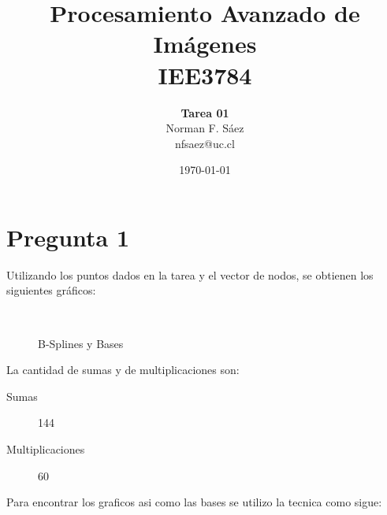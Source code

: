 \documentclass[a4paper,10pt]{article}
\title{Procesamiento Avanzado de Imágenes\\IEE3784}
\author{\textbf{Tarea 01}\\Norman F. S\'aez\\nfsaez@uc.cl}
\date{\today}
\begin{document}
\maketitle
\section{Pregunta 1}
Utilizando los puntos dados en la tarea y el vector de nodos, se obtienen los siguientes gráficos:
\begin{figure}[ht!]
  \centering
  ~ 
  ~ 
  \caption{B-Splines y Bases}
  \label{fig:p1}
\end{figure}
La cantidad de sumas y de multiplicaciones son:
\begin{description}
\item[Sumas] 144
\item[Multiplicaciones] 60
\end{description} 
Para encontrar los graficos asi como las bases se utilizo la tecnica como sigue:
\end{document}
